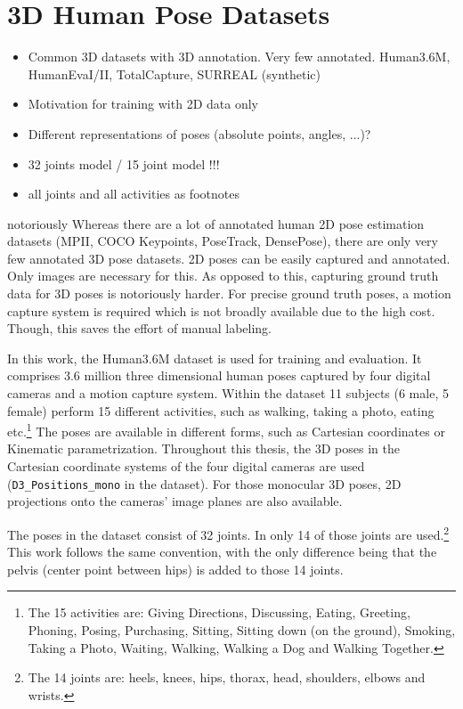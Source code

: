 \section{3D Human Pose Datasets}
\label{sec:data}

\begin{itemize}
	\item Common 3D datasets with 3D annotation. Very few annotated. Human3.6M, HumanEvaI/II, TotalCapture, SURREAL (synthetic)
	\item Motivation for training with 2D data only
	\item Different representations of poses (absolute points, angles, ...)?
	\item 32 joints model / 15 joint model !!!
	\item all joints and all activities as footnotes
\end{itemize}
 
notoriously
Whereas there are a lot of annotated human 2D pose estimation datasets (MPII, COCO Keypoints, PoseTrack, DensePose), there are only very few annotated 3D pose datasets. 
2D poses can be easily captured and annotated.
Only images are necessary for this.
As opposed to this, capturing ground truth data for 3D poses is notoriously harder.
For precise ground truth poses, a motion capture system is required which is not broadly available due to the high cost.
Though, this saves the effort of manual labeling.



In this work, the Human3.6M dataset \cite{ionescu14} is used for training and evaluation.
It comprises 3.6 million three dimensional human poses captured by four digital cameras and a motion capture system.
Within the dataset 11 subjects (6 male, 5 female) perform 15 different activities, such as walking, taking a photo, eating etc.\footnote{
	The 15 activities are: Giving Directions, Discussing, Eating, Greeting, Phoning, Posing, Purchasing, Sitting, Sitting down (on the ground), Smoking, Taking a Photo, Waiting, Walking, Walking a Dog and Walking Together.
}
The poses are available in different forms, such as Cartesian coordinates or Kinematic parametrization.
Throughout this thesis, the 3D poses in the Cartesian coordinate systems of the four digital cameras are used (\texttt{D3\_Positions\_mono} in the dataset).
For those monocular 3D poses, 2D projections onto the cameras' image planes are also available.

The poses in the dataset consist of 32 joints.
In \cite{drover18} only 14 of those joints are used.\footnote{
The 14 joints are: heels, knees, hips, thorax, head, shoulders, elbows and wrists.
}
This work follows the same convention, with the only difference being that the pelvis (center point between hips) is added to those 14 joints.

